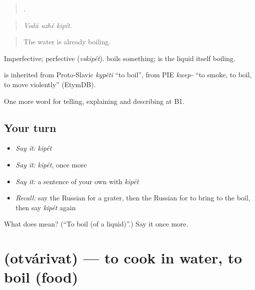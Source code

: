 \begin{quote}
  .
\end{quote}

\begin{quote}
\emph{Vodá uzhé kipít.}
\end{quote}

\begin{quote}
The water is already boiling.
\end{quote}

Imperfective; perfective \emph{} (\emph{vskipét}). \emph{} boils something; \emph{} is the liquid itself boiling.

\begin{cousinweb}
\emph{} is inherited from Proto-Slavic \emph{kypěti} \textquotedblleft{}to boil\textquotedblright{}, from PIE \emph{kwep-} \textquotedblleft{}to smoke, to boil, to move violently\textquotedblright{} (EtymDB).
\end{cousinweb}

\begin{grammarlens}[title={What you've built}]
One more word for telling, explaining and describing at B1.
\end{grammarlens}

\subsection*{Your turn}
\begin{itemize}
\raggedright
  \item \emph{Say it:} \emph{kipét}
  \item \emph{Say it:} \emph{kipét}, once more
  \item \emph{Say it:} a sentence of your own with \emph{kipét}
  \item \emph{Recall:} say the Russian for a grater, then the Russian for to bring to the boil, then say \emph{kipét} again
\end{itemize}

\begin{tcolorbox}[breakable,colback=teal!4,colframe=teal!35!black,title={Before you move on}]
What does  mean? (\textquotedblleft{}To boil (of a liquid)\textquotedblright{}.) Say it once more.
\end{tcolorbox}
\section[\texorpdfstring{\ru{отваривать} (otvárivat)}{отваривать (otvárivat)}]{ (otvárivat) — to cook in water, to boil (food)}

